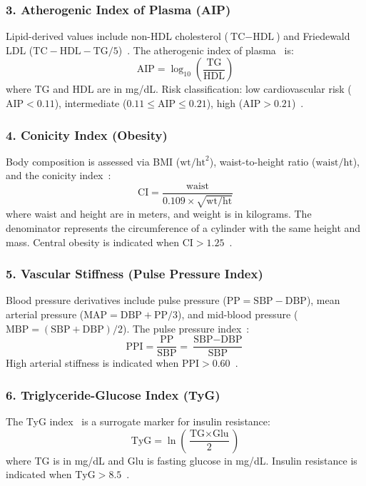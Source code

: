 \subsubsection*{3. Atherogenic Index of Plasma (AIP)}
Lipid-derived values include non-HDL cholesterol ($\text{TC} - \text{HDL}$) and Friedewald LDL ($\text{TC} - \text{HDL} - \text{TG}/5$)~\cite{friedewald1972estimation}. The atherogenic index of plasma~\cite{dobiasova2001atherogenic} is:
\begin{equation}
\text{AIP} = \log_{10}\!\left(\frac{\text{TG}}{\text{HDL}}\right)
\end{equation}
where TG and HDL are in mg/dL. Risk classification: low cardiovascular risk ($\text{AIP} < 0.11$), intermediate ($0.11 \leq \text{AIP} \leq 0.21$), high ($\text{AIP} > 0.21$)~\cite{dobiasova2004atherogenic}.

\subsubsection*{4. Conicity Index (Obesity)}
Body composition is assessed via BMI ($\text{wt}/\text{ht}^2$), waist-to-height ratio ($\text{waist}/\text{ht}$), and the conicity index~\cite{valdez1991simple}:
\begin{equation}
\text{CI} = \frac{\text{waist}}{0.109 \times \sqrt{\text{wt}/\text{ht}}}
\end{equation}
where waist and height are in meters, and weight is in kilograms. The denominator represents the circumference of a cylinder with the same height and mass. Central obesity is indicated when $\text{CI} > 1.25$~\cite{pitanga2005sensitivity}.

\subsubsection*{5. Vascular Stiffness (Pulse Pressure Index)}
Blood pressure derivatives include pulse pressure ($\text{PP} = \text{SBP} - \text{DBP}$), mean arterial pressure ($\text{MAP} = \text{DBP} + \text{PP}/3$), and mid-blood pressure ($\text{MBP} = (\text{SBP} + \text{DBP})/2$). The pulse pressure index~\cite{kovaite2008arterial}:
\begin{equation}
\text{PPI} = \frac{\text{PP}}{\text{SBP}} = \frac{\text{SBP} - \text{DBP}}{\text{SBP}}
\end{equation}
High arterial stiffness is indicated when $\text{PPI} > 0.60$~\cite{franklin2009predictive}.

\subsubsection*{6. Triglyceride-Glucose Index (TyG)}
The TyG index~\cite{simental2008triglyceride} is a surrogate marker for insulin resistance:
\begin{equation}
\text{TyG} = \ln\!\left(\frac{\text{TG} \times \text{Glu}}{2}\right)
\end{equation}
where TG is in mg/dL and Glu is fasting glucose in mg/dL. Insulin resistance is indicated when $\text{TyG} > 8.5$~\cite{guerrero2010product}.

